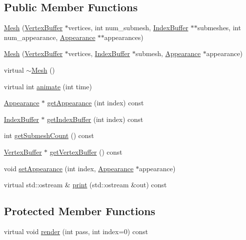 \subsection*{Public Member Functions}
\begin{CompactItemize}
\item 
\hyperlink{classm3g_1_1Mesh_2545f0abeee27d408d3129f3a5df40bb}{Mesh} (\hyperlink{classm3g_1_1VertexBuffer}{VertexBuffer} $\ast$vertices, int num\_\-submesh, \hyperlink{classm3g_1_1IndexBuffer}{IndexBuffer} $\ast$$\ast$submeshes, int num\_\-appearance, \hyperlink{classm3g_1_1Appearance}{Appearance} $\ast$$\ast$appearances)
\item 
\hyperlink{classm3g_1_1Mesh_2d7766ebbb63eccd77d0dd8b53b400a3}{Mesh} (\hyperlink{classm3g_1_1VertexBuffer}{VertexBuffer} $\ast$vertices, \hyperlink{classm3g_1_1IndexBuffer}{IndexBuffer} $\ast$submesh, \hyperlink{classm3g_1_1Appearance}{Appearance} $\ast$appearance)
\item 
virtual \hyperlink{classm3g_1_1Mesh_6e26384cfb03023e7dc2e5419baf813f}{$\sim$Mesh} ()
\item 
virtual int \hyperlink{classm3g_1_1Mesh_82cfeb67ca66b93e2ca7bda9a4f0e2aa}{animate} (int time)
\item 
\hyperlink{classm3g_1_1Appearance}{Appearance} $\ast$ \hyperlink{classm3g_1_1Mesh_4950a19e02c022dcf41a086117eb8219}{getAppearance} (int index) const 
\item 
\hyperlink{classm3g_1_1IndexBuffer}{IndexBuffer} $\ast$ \hyperlink{classm3g_1_1Mesh_ca34a663f46ce20e2b894c046714ea1d}{getIndexBuffer} (int index) const 
\item 
int \hyperlink{classm3g_1_1Mesh_5dc5a57ad549eb97504c2a1280a882dd}{getSubmeshCount} () const 
\item 
\hyperlink{classm3g_1_1VertexBuffer}{VertexBuffer} $\ast$ \hyperlink{classm3g_1_1Mesh_7602e9bf450fa8b3ec3c60e2e88cba25}{getVertexBuffer} () const 
\item 
void \hyperlink{classm3g_1_1Mesh_bb03b872c453c4f8f3fe31e8b54d1b52}{setAppearance} (int index, \hyperlink{classm3g_1_1Appearance}{Appearance} $\ast$appearance)
\item 
virtual std::ostream \& \hyperlink{classm3g_1_1Mesh_6fea17fa1532df3794f8cb39cb4f911f}{print} (std::ostream \&out) const 
\end{CompactItemize}
\subsection*{Protected Member Functions}
\begin{CompactItemize}
\item 
virtual void \hyperlink{classm3g_1_1Mesh_1efcb1973989d9963d5bd6d03065d389}{render} (int pass, int index=0) const 
\end{CompactItemize}
